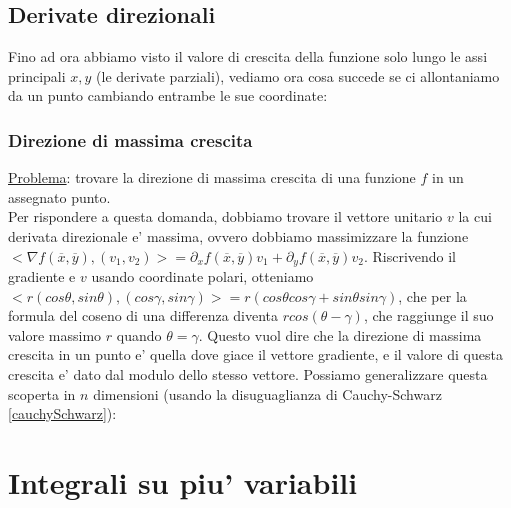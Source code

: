 \documentclass{report}
\begin{document}
\section{Derivate direzionali}
Fino ad ora abbiamo visto il valore di crescita della funzione solo lungo le assi principali $ x,y $ (le derivate parziali), vediamo ora cosa succede se ci allontaniamo da un punto cambiando entrambe le sue coordinate:
\subsection{Direzione di massima crescita}
\underline{Problema}: trovare la direzione di massima crescita di una funzione $ f $ in un assegnato punto.\\
Per rispondere a questa domanda, dobbiamo trovare il vettore unitario $ v $ la cui derivata direzionale e' massima, ovvero dobbiamo massimizzare la funzione $ <\nabla f(\overline{x}, \overline{y}), (v_1,v_2)> = \partial_x f(\overline{x}, \overline{y}) v_1 + \partial_yf(\overline{x}, \overline{y}) v_2 $. Riscrivendo il gradiente e $ v $ usando coordinate polari, otteniamo $ <r(cos\theta, sin\theta), (cos\gamma, sin\gamma)> = r(cos\theta cos\gamma+sin\theta sin\gamma) $, che per la formula del coseno di una differenza diventa $ rcos(\theta - \gamma) $, che raggiunge il suo valore massimo $ r $ quando $ \theta = \gamma $. Questo vuol dire che la direzione di massima crescita in un punto e' quella dove giace il vettore gradiente, e il valore di questa crescita e' dato dal modulo dello stesso vettore. Possiamo generalizzare questa scoperta in $ n $ dimensioni (usando la disuguaglianza di Cauchy-Schwarz \ref{cauchySchwarz}):

\chapter{Integrali su piu' variabili}
\end{document}
